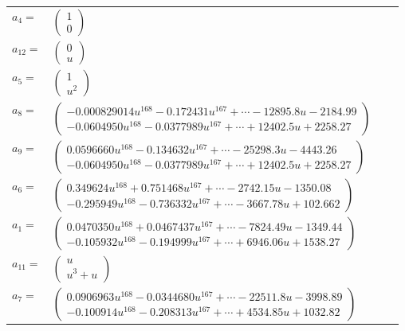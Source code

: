 \documentclass[1p]{elsarticle_modified}
\theoremstyle{definition}
\begin{document}
\begin{tabular}{m{7pt} m{180pt} m{7pt} m{180pt} }
\flushright $a_{4}=$&$\begin{pmatrix}1\\0\end{pmatrix}$ \\
\flushright $a_{12}=$&$\begin{pmatrix}0\\u\end{pmatrix}$ \\
\flushright $a_{5}=$&$\begin{pmatrix}1\\u^2\end{pmatrix}$ \\
\flushright $a_{8}=$&$\begin{pmatrix}-0.000829014 u^{168}-0.172431 u^{167}+\cdots-12895.8 u-2184.99\\-0.0604950 u^{168}-0.0377989 u^{167}+\cdots+12402.5 u+2258.27\end{pmatrix}$ \\
\flushright $a_{9}=$&$\begin{pmatrix}0.0596660 u^{168}-0.134632 u^{167}+\cdots-25298.3 u-4443.26\\-0.0604950 u^{168}-0.0377989 u^{167}+\cdots+12402.5 u+2258.27\end{pmatrix}$ \\
\flushright $a_{6}=$&$\begin{pmatrix}0.349624 u^{168}+0.751468 u^{167}+\cdots-2742.15 u-1350.08\\-0.295949 u^{168}-0.736332 u^{167}+\cdots-3667.78 u+102.662\end{pmatrix}$ \\
\flushright $a_{1}=$&$\begin{pmatrix}0.0470350 u^{168}+0.0467437 u^{167}+\cdots-7824.49 u-1349.44\\-0.105932 u^{168}-0.194999 u^{167}+\cdots+6946.06 u+1538.27\end{pmatrix}$ \\
\flushright $a_{11}=$&$\begin{pmatrix}u\\u^3+u\end{pmatrix}$ \\
\flushright $a_{7}=$&$\begin{pmatrix}0.0906963 u^{168}-0.0344680 u^{167}+\cdots-22511.8 u-3998.89\\-0.100914 u^{168}-0.208313 u^{167}+\cdots+4534.85 u+1032.82\end{pmatrix}$ \\

\end{tabular}
\end{document}
